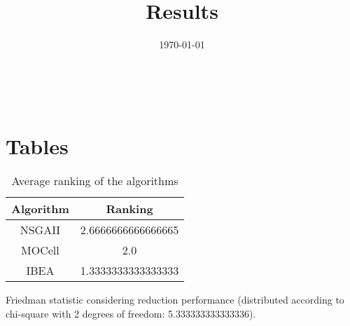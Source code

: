 \documentclass{article}
\title{Results}
\author{}
\date{\today}
\begin{document}
\oddsidemargin 0in \topmargin 0in\maketitle
\
\section{Tables}
\begin{table}[!htp]
\centering
\caption{Average ranking of the algorithms}
\begin{tabular}{c|c}
Algorithm&Ranking\\
\hline
NSGAII&2.6666666666666665\\
MOCell&2.0\\
IBEA&1.3333333333333333\\
\end{tabular}
\end{table}


Friedman statistic considering reduction performance (distributed according to chi-square with 2 degrees of freedom: 5.333333333333336).
\end{document}
